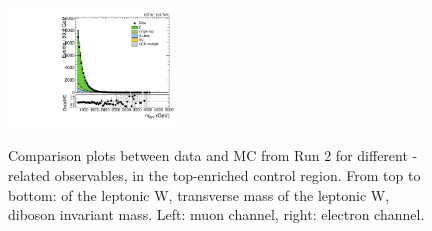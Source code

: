 \begin{figure}[htbp]
  \includegraphics[width=0.4\textwidth]{fig/controlPlots/CR_b1_e_allP_allC_allD_Run2_mWV.pdf}\\
  \caption{
    Comparison plots between data and MC from Run 2 for different \Wlep-related observables, in the top-enriched control region.
    From top to bottom: \pt of the leptonic W, transverse mass of the leptonic W, diboson invariant mass.
    Left: muon channel, right: electron channel.
    }
  \label{fig:CR_controlPlotsRun2_2}
\end{figure}

